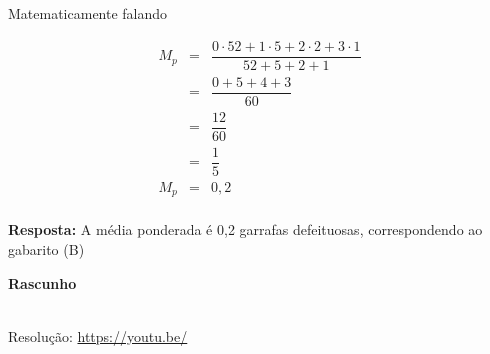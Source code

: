 Matematicamente falando



\begin{eqnarray*}
    M_{p} 	&=& \dfrac{0 \cdot 52 + 1 \cdot 5 + 2 \cdot 2 + 3 \cdot 1}{52 + 5 + 2 + 1} \\
            &=& \dfrac{0 + 5 + 4 + 3}{60} \\
            &=& \dfrac{12}{60} \\
            &=& \dfrac{1}{5} \\
    M_{p}   &=& 0,2 \\
\end{eqnarray*}

\textbf{Resposta:} A média ponderada é 0,2 garrafas defeituosas, correspondendo ao gabarito (B)


\textbf{Rascunho}


\begin{center}
    \href{https://youtu.be/}{
    }\\
    Resolução: \url{https://youtu.be/}
\end{center}
